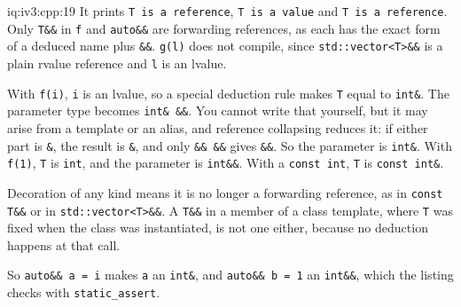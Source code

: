 \begin{solution}{iq:iv3:cpp:19}
It prints \texttt{T is a reference}, \texttt{T is a value} and \texttt{T is a reference}. Only \texttt{T\&\&} in \texttt{f} and \texttt{auto\&\&} are forwarding references, as each has the exact form of a deduced name plus \texttt{\&\&}. \texttt{g(l)} does not compile, since \texttt{std::vector<T>\&\&} is a plain rvalue reference and \texttt{l} is an lvalue.

With \texttt{f(i)}, \texttt{i} is an lvalue, so a special deduction rule makes \texttt{T} equal to \texttt{int\&}. The parameter type becomes \texttt{int\& \&\&}. You cannot write that yourself, but it may arise from a template or an alias, and reference collapsing reduces it: if either part is \texttt{\&}, the result is \texttt{\&}, and only \texttt{\&\& \&\&} gives \texttt{\&\&}. So the parameter is \texttt{int\&}. With \texttt{f(1)}, \texttt{T} is \texttt{int}, and the parameter is \texttt{int\&\&}. With a \texttt{const int}, \texttt{T} is \texttt{const int\&}.

Decoration of any kind means it is no longer a forwarding reference, as in \texttt{const T\&\&} or in \texttt{std::vector<T>\&\&}. A \texttt{T\&\&} in a member of a class template, where \texttt{T} was fixed when the class was instantiated, is not one either, because no deduction happens at that call.

So \texttt{auto\&\& a = i} makes \texttt{a} an \texttt{int\&}, and \texttt{auto\&\& b = 1} an \texttt{int\&\&}, which the listing checks with \texttt{static\_assert}.

\end{solution}

